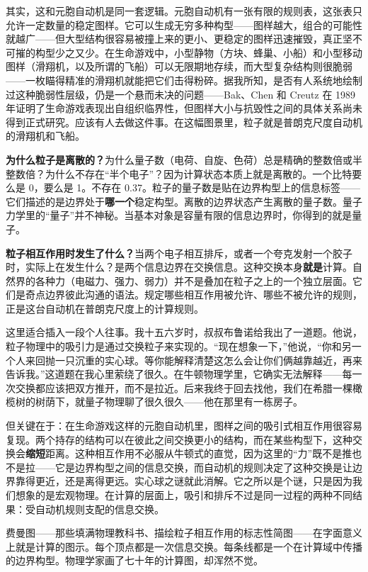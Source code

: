 \documentclass[11pt, twoside, openright]{book}
\begin{document}
其实，这和元胞自动机是同一套逻辑。元胞自动机有一张有限的规则表，这张表只允许一定数量的稳定图样。它可以生成无穷多种构型------图样越大，组合的可能性就越广------但大型结构很容易被撞上来的更小、更稳定的图样迅速摧毁，真正坚不可摧的构型少之又少。在生命游戏中，小型静物（方块、蜂巢、小船）和小型移动图样（滑翔机，以及所谓的飞船）可以无限期地存续，而大型复杂结构则很脆弱------一枚瞄得精准的滑翔机就能把它们击得粉碎。据我所知，是否有人系统地绘制过这种脆弱性层级，仍是一个悬而未决的问题------Bak、Chen 和 Creutz 在 1989 年证明了生命游戏表现出自组织临界性，但图样大小与抗毁性之间的具体关系尚未得到正式研究。应该有人去做这件事。在这幅图景里，粒子就是普朗克尺度自动机的滑翔机和飞船。

\textbf{为什么粒子是离散的？}为什么量子数（电荷、自旋、色荷）总是精确的整数倍或半整数倍？为什么不存在“半个电子”？因为计算状态本质上就是离散的。一个比特要么是 0，要么是 1。不存在 0.37。粒子的量子数是贴在边界构型上的信息标签------它们描述的是边界处于\textbf{哪一个}稳定构型。离散的边界状态产生离散的量子数。量子力学里的“量子”并不神秘。当基本对象是容量有限的信息边界时，你得到的就是量子。

\textbf{粒子相互作用时发生了什么？}当两个电子相互排斥，或者一个夸克发射一个胶子时，实际上在发生什么？是两个信息边界在交换信息。这种交换本身\textbf{就是}计算。自然界的各种力（电磁力、强力、弱力）并不是叠加在粒子之上的一个独立层面。它们是奇点边界彼此沟通的语法。规定哪些相互作用被允许、哪些不被允许的规则，正是这台自动机在普朗克尺度上的计算规则。

这里适合插入一段个人往事。我十五六岁时，叔叔布鲁诺给我出了一道题。他说，粒子物理中的吸引力是通过交换粒子来实现的。“现在想象一下，”他说，“你和另一个人来回抛一只沉重的实心球。等你能解释清楚这怎么会让你们俩越靠越近，再来告诉我。”这道题在我心里萦绕了很久。在牛顿物理学里，它确实无法解释------每一次交换都应该把双方推开，而不是拉近。后来我终于回去找他，我们在希腊一棵橄榄树的树荫下，就量子物理聊了很久很久------他在那里有一栋房子。

但关键在于：在生命游戏这样的元胞自动机里，图样之间的吸引式相互作用很容易复现。两个持存的结构可以在彼此之间交换更小的结构，而在某些构型下，这种交换会\textbf{缩短}距离。这种相互作用不必服从牛顿式的直觉，因为这里的“力”既不是推也不是拉------它是边界构型之间的信息交换，而自动机的规则决定了这种交换是让边界靠得更近，还是离得更远。实心球之谜就此消解。它之所以是个谜，只是因为我们想象的是宏观物理。在计算的层面上，吸引和排斥不过是同一过程的两种不同结果：受自动机规则支配的信息交换。

费曼图------那些填满物理教科书、描绘粒子相互作用的标志性简图------在字面意义上就是计算的图示。每个顶点都是一次信息交换。每条线都是一个在计算域中传播的边界构型。物理学家画了七十年的计算图，却浑然不觉。
\end{document}
